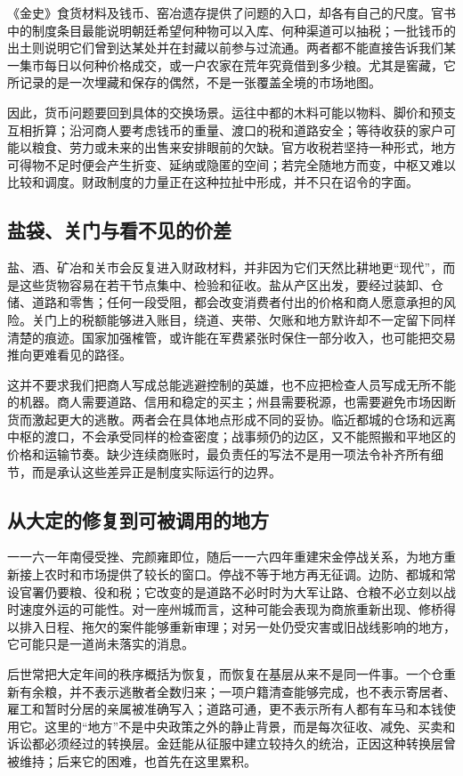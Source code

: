 《金史》食货材料及钱币、窑冶遗存提供了问题的入口，却各有自己的尺度。官书中的制度条目最能说明朝廷希望何种物可以入库、何种渠道可以抽税；一批钱币的出土则说明它们曾到达某处并在封藏以前参与过流通。两者都不能直接告诉我们某一集市每日以何种价格成交，或一户农家在荒年究竟借到多少粮。尤其是窖藏，它所记录的是一次埋藏和保存的偶然，不是一张覆盖全境的市场地图。

因此，货币问题要回到具体的交换场景。运往中都的木料可能以物料、脚价和预支互相折算；沿河商人要考虑钱币的重量、渡口的税和道路安全；等待收获的家户可能以粮食、劳力或未来的出售来安排眼前的欠缺。官方收税若坚持一种形式，地方可得物不足时便会产生折变、延纳或隐匿的空间；若完全随地方而变，中枢又难以比较和调度。财政制度的力量正在这种拉扯中形成，并不只在诏令的字面。

\subsection{盐袋、关门与看不见的价差}

盐、酒、矿冶和关市会反复进入财政材料，并非因为它们天然比耕地更“现代”，而是这些货物容易在若干节点集中、检验和征收。盐从产区出发，要经过装卸、仓储、道路和零售；任何一段受阻，都会改变消费者付出的价格和商人愿意承担的风险。关门上的税额能够进入账目，绕道、夹带、欠账和地方默许却不一定留下同样清楚的痕迹。国家加强榷管，或许能在军费紧张时保住一部分收入，也可能把交易推向更难看见的路径。

这并不要求我们把商人写成总能逃避控制的英雄，也不应把检查人员写成无所不能的机器。商人需要道路、信用和稳定的买主；州县需要税源，也需要避免市场因断货而激起更大的逃散。两者会在具体地点形成不同的妥协。临近都城的仓场和远离中枢的渡口，不会承受同样的检查密度；战事频仍的边区，又不能照搬和平地区的价格和运输节奏。缺少连续商账时，最负责任的写法不是用一项法令补齐所有细节，而是承认这些差异正是制度实际运行的边界。

\subsection{从大定的修复到可被调用的地方}

一一六一年南侵受挫、完颜雍即位，随后一一六四年重建宋金停战关系，为地方重新接上农时和市场提供了较长的窗口。停战不等于地方再无征调。边防、都城和常设官署仍要粮、役和税；它改变的是道路不必时时为大军让路、仓粮不必立刻以战时速度外运的可能性。对一座州城而言，这种可能会表现为商旅重新出现、修桥得以排入日程、拖欠的案件能够重新审理；对另一处仍受灾害或旧战线影响的地方，它可能只是一道尚未落实的消息。

后世常把大定年间的秩序概括为恢复，而恢复在基层从来不是同一件事。一个仓重新有余粮，并不表示逃散者全数归来；一项户籍清查能够完成，也不表示寄居者、雇工和暂时分居的亲属被准确写入；道路可通，更不表示所有人都有车马和本钱使用它。这里的“地方”不是中央政策之外的静止背景，而是每次征收、减免、买卖和诉讼都必须经过的转换层。金廷能从征服中建立较持久的统治，正因这种转换层曾被维持；后来它的困难，也首先在这里累积。
